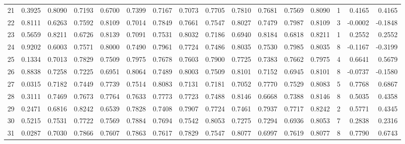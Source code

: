 \begin{tabular}{lrrrrrrrrrrrrrrr}
21  &      0.3925 &  0.8090 &  0.7193 &  0.6700 &  0.7399 &  0.7167 &  0.7073 &  0.7705 &  0.7810 &  0.7681 &   0.7569 &     0.8090 &      1 &                    0.4165 &                     0.4165 \\
22  &      0.8111 &  0.6263 &  0.7592 &  0.8109 &  0.7014 &  0.7849 &  0.7661 &  0.7547 &  0.8027 &  0.7479 &   0.7987 &     0.8109 &      3 &                   -0.0002 &                    -0.1848 \\
23  &      0.5659 &  0.8211 &  0.6726 &  0.8139 &  0.7091 &  0.7531 &  0.8032 &  0.7186 &  0.6940 &  0.8184 &   0.6818 &     0.8211 &      1 &                    0.2552 &                     0.2552 \\
24  &      0.9202 &  0.6003 &  0.7571 &  0.8000 &  0.7490 &  0.7961 &  0.7724 &  0.7486 &  0.8035 &  0.7530 &   0.7985 &     0.8035 &      8 &                   -0.1167 &                    -0.3199 \\
25  &      0.1334 &  0.7013 &  0.7829 &  0.7509 &  0.7975 &  0.7678 &  0.7603 &  0.7900 &  0.7725 &  0.7383 &   0.7662 &     0.7975 &      4 &                    0.6641 &                     0.5679 \\
26  &      0.8838 &  0.7258 &  0.7225 &  0.6951 &  0.8064 &  0.7489 &  0.8003 &  0.7509 &  0.8101 &  0.7152 &   0.6945 &     0.8101 &      8 &                   -0.0737 &                    -0.1580 \\
27  &      0.0315 &  0.7182 &  0.7449 &  0.7739 &  0.7514 &  0.8083 &  0.7131 &  0.7181 &  0.7052 &  0.7770 &   0.7529 &     0.8083 &      5 &                    0.7768 &                     0.6867 \\
28  &      0.3111 &  0.7469 &  0.7673 &  0.7764 &  0.7633 &  0.7773 &  0.7723 &  0.7488 &  0.8146 &  0.6668 &   0.7388 &     0.8146 &      8 &                    0.5035 &                     0.4358 \\
29  &      0.2471 &  0.6816 &  0.8242 &  0.6539 &  0.7828 &  0.7408 &  0.7907 &  0.7724 &  0.7461 &  0.7937 &   0.7717 &     0.8242 &      2 &                    0.5771 &                     0.4345 \\
30  &      0.5215 &  0.7531 &  0.7722 &  0.7569 &  0.7884 &  0.7694 &  0.7542 &  0.8053 &  0.7275 &  0.7294 &   0.6936 &     0.8053 &      7 &                    0.2838 &                     0.2316 \\
31  &      0.0287 &  0.7030 &  0.7866 &  0.7607 &  0.7863 &  0.7617 &  0.7829 &  0.7547 &  0.8077 &  0.6997 &   0.7619 &     0.8077 &      8 &                    0.7790 &                     0.6743 \\

\end{tabular}
